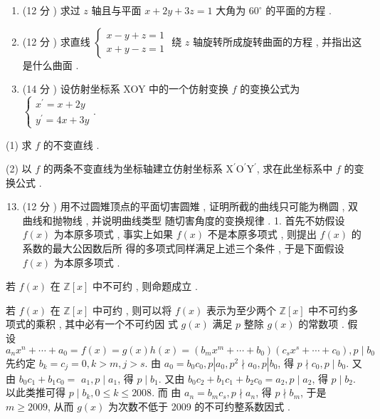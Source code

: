 \documentclass[10pt]{article}
\begin{document}
\begin{enumerate}
  \item (12 分 )  求过  $z$  轴且与平面  $x+2 y+3 z=1$  大角为  $60^{\circ}$  的平面的方程 .

  \item (12 分 )  求直线  $\left\{\begin{array}{l}x-y+z=1 \\ x+y-z=1\end{array}\right.$  绕  $z$  轴旋转所成旋转曲面的方程 ,  并指出这是什么曲面 .

  \item (14  分 )  设仿射坐标系 XOY 中的一个仿射变换  $f$  的变换公式为  $\left\{\begin{array}{l}x^{\prime}=x+2 y \\ y^{\prime}=4 x+3 y\end{array}\right.$.

\end{enumerate}
(1)  求  $f$  的不变直线 .

(2)  以  $f$  的两条不变直线为坐标轴建立仿射坐标系  $\mathrm{X}^{\prime} \mathrm{O}^{\prime} \mathrm{Y}^{\prime}$,  求在此坐标系中  $f$  的变换公式 .

\begin{enumerate}
  \setcounter{enumi}{12}
  \item (12 分 )  用不过圆雉顶点的平面切害圆雉 ,  证明所截的曲线只可能为椭圆 ,  双曲线和抛物线 ,  并说明曲线类型   随切害角度的变换规律 . 1.  首先不妨假设  $f(x)$  为本原多项式 ,  事实上如果  $f(x)$  不是本原多项式 ,  则提出  $f(x)$  的系数的最大公因数后所   得的多项式同样满足上述三个条件 ,  于是下面假设  $f(x)$  为本原多项式 .
\end{enumerate}
 若  $f(x)$  在  $\mathbb{Z}[x]$  中不可约 ,  则命题成立 .

 若  $f(x)$  在  $\mathbb{Z}[x]$  中可约 ,  则可以将  $f(x)$  表示为至少两个  $\mathbb{Z}[x]$  中不可约多项式的乘积 ,  其中必有一个不可约因   式  $g(x)$  满足  $p$  整除  $g(x)$  的常数项 .  假设 
$$
a_{n} x^{n}+\cdots+a_{0}=f(x)=g(x) h(x)=\left(b_{m} x^{m}+\cdots+b_{0}\right)\left(c_{s} x^{s}+\cdots+c_{0}\right), p \mid b_{0}
$$
 先约定  $b_{k}=c_{j}=0, k>m, j>s$.  由  $a_{0}=b_{0} c_{0}, p\left|a_{0}, p^{2} \nmid a_{0}, p\right| b_{0}$,  得  $p \nmid c_{0}, p \mid b_{0}$.  又由  $b_{0} c_{1}+b_{1} c_{0}=$ $a_{1}, p \mid a_{1}$,  得  $p \mid b_{1}$.  又由  $b_{0} c_{2}+b_{1} c_{1}+b_{2} c_{0}=a_{2}, p \mid a_{2}$,  得  $p \mid b_{2}$.  以此类推可得  $p \mid b_{k}, 0 \leq k \leq 2008$.  而   由  $a_{n}=b_{m} c_{s}, p \nmid a_{n}$,  得  $p \nmid b_{m}$,  于是  $m \geq 2009$,  从而  $g(x)$  为次数不低于  2009  的不可约整系数因式 .
\end{document}
